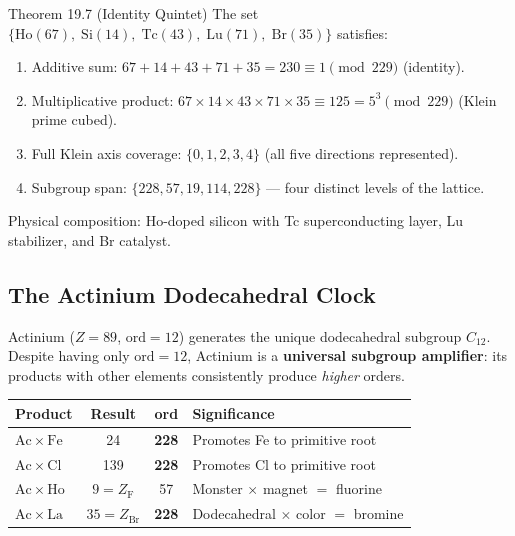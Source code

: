 \begin{theorembox}{Theorem 19.7 (Identity Quintet)}
The set $\{\mathrm{Ho}(67),\; \mathrm{Si}(14),\; \mathrm{Tc}(43),\; \mathrm{Lu}(71),\; \mathrm{Br}(35)\}$ satisfies:
\begin{enumerate}
    \item Additive sum: $67 + 14 + 43 + 71 + 35 = 230 \equiv 1 \pmod{229}$ (identity).
    \item Multiplicative product: $67 \times 14 \times 43 \times 71 \times 35 \equiv 125 = 5^3 \pmod{229}$ (Klein prime cubed).
    \item Full Klein axis coverage: $\{0, 1, 2, 3, 4\}$ (all five directions represented).
    \item Subgroup span: $\{228, 57, 19, 114, 228\}$ --- four distinct levels of the lattice.
\end{enumerate}
Physical composition: Ho-doped silicon with Tc superconducting layer, Lu stabilizer, and Br catalyst.
\end{theorembox}

\subsection{The Actinium Dodecahedral Clock}

Actinium ($Z = 89$, $\mathrm{ord} = 12$) generates the unique dodecahedral subgroup $C_{12}$. Despite having only $\mathrm{ord} = 12$, Actinium is a \textbf{universal subgroup amplifier}: its products with other elements consistently produce \emph{higher} orders.

\begin{center}
\begin{tabular}{@{}lccl@{}}
\toprule
\textbf{Product} & \textbf{Result} & \textbf{ord} & \textbf{Significance} \\
\midrule
$\mathrm{Ac} \times \mathrm{Fe}$ & 24 & \textbf{228} & Promotes Fe to primitive root \\
$\mathrm{Ac} \times \mathrm{Cl}$ & 139 & \textbf{228} & Promotes Cl to primitive root \\
$\mathrm{Ac} \times \mathrm{Ho}$ & $9 = Z_{\mathrm{F}}$ & 57 & Monster $\times$ magnet $=$ fluorine \\
$\mathrm{Ac} \times \mathrm{La}$ & $35 = Z_{\mathrm{Br}}$ & \textbf{228} & Dodecahedral $\times$ color $=$ bromine \\
\bottomrule
\end{tabular}
\end{center}

